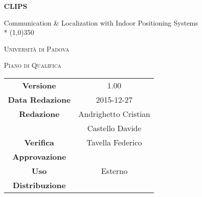 \documentclass{article}
\author{Andrighetto Cristian, Castello Davide}
\date{27/12/2015}
\begin{document}
	\begin{titlepage}
		\centering
	{\huge\bfseries CLIPS\par}
	Communication \& Localization with Indoor Positioning Systems \\*
	\line(1,0){350} \\
	{\scshape\LARGE Università di Padova \par}
	\vspace{1cm}
	{\scshape\Large Piano di Qualifica \par}
	\logo
	\newpage
		\begin{tabular}{c|c}
			{\hfill \textbf{Versione}} 			& 1.00			\\
			{\hfill\textbf{Data Redazione}} 		& 2015-12-27  		\\ 
			{\hfill\textbf{Redazione}} 			&  Andrighetto Cristian \\ 
											& Castello Davide       \\
			{\hfill\textbf{Verifica}} 				&  Tavella Federico   \\
			{\hfill\textbf{Approvazione}} 		&  \\
			{\hfill\textbf{Uso}} 					& Esterno			\\
			{\hfill\textbf{Distribuzione}} 			& \leaf			\\
		\end{tabular}
	\end{titlepage}
	
	\newpage
		
	
	\newpage
		\tableofcontents
	
	\newpage
		\listoftables
	
	\label{LastFrontPage}
	\newpage
		\pagestyle{mymain}
	
\newpage
	
\newpage
	
\newpage
	
\newpage
	
\newpage
	
\label{LastPage}
\end{document}
